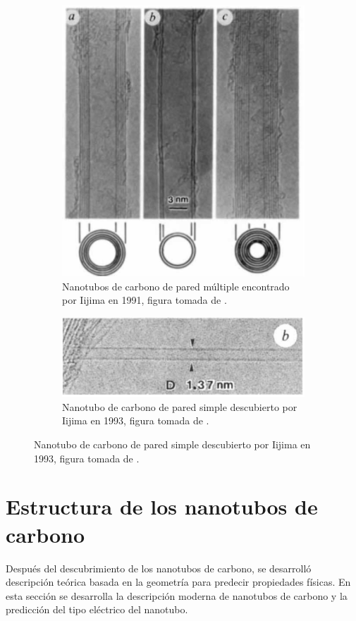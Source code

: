 \begin{figure}[!hbt]
\begin{subfigure}{.5\textwidth}
  \centering
  \includegraphics[width=.6\linewidth]{CNT/MWCNTiijima1991.png}  
  \caption{Nanotubos de carbono de pared múltiple encontrado por Iijima en 1991, figura tomada de \cite{Iijima1991}.}
  \label{fig:iijima1991}
\end{subfigure}
\begin{subfigure}{.5\textwidth}
  \centering
  \includegraphics[width=.7\linewidth]{CNT/SWCNTiijima1993.png}  
  \caption{Nanotubo de carbono de pared simple descubierto por Iijima en 1993, figura tomada de \cite{Iijima1993}.}
  \label{fig:iijima1993}
\end{subfigure}
\end{figure}

\section{Estructura de los nanotubos de carbono}\label{teoriaCNT}

Después del descubrimiento de los nanotubos de carbono, se desarrolló descripción teórica basada en la geometría para predecir propiedades físicas. En esta sección se desarrolla la descripción moderna de nanotubos de carbono y la predicción del tipo eléctrico del nanotubo.\\

